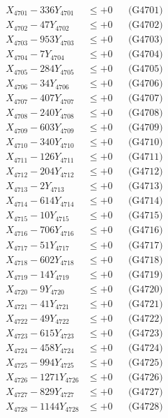 \documentclass[a4paper,10pt]{article}
\begin{document}
{\begin{align}
\allowbreak
X_{4701} - 336Y_{4701} &\leq +0 && \text{(G4701)} \\
X_{4702} - 47Y_{4702} &\leq +0 && \text{(G4702)} \\
X_{4703} - 953Y_{4703} &\leq +0 && \text{(G4703)} \\
X_{4704} - 7Y_{4704} &\leq +0 && \text{(G4704)} \\
X_{4705} - 284Y_{4705} &\leq +0 && \text{(G4705)} \\
X_{4706} - 34Y_{4706} &\leq +0 && \text{(G4706)} \\
X_{4707} - 407Y_{4707} &\leq +0 && \text{(G4707)} \\
X_{4708} - 240Y_{4708} &\leq +0 && \text{(G4708)} \\
X_{4709} - 603Y_{4709} &\leq +0 && \text{(G4709)} \\
X_{4710} - 340Y_{4710} &\leq +0 && \text{(G4710)} \\
\allowbreak
X_{4711} - 126Y_{4711} &\leq +0 && \text{(G4711)} \\
X_{4712} - 204Y_{4712} &\leq +0 && \text{(G4712)} \\
X_{4713} - 2Y_{4713} &\leq +0 && \text{(G4713)} \\
X_{4714} - 614Y_{4714} &\leq +0 && \text{(G4714)} \\
X_{4715} - 10Y_{4715} &\leq +0 && \text{(G4715)} \\
X_{4716} - 706Y_{4716} &\leq +0 && \text{(G4716)} \\
X_{4717} - 51Y_{4717} &\leq +0 && \text{(G4717)} \\
X_{4718} - 602Y_{4718} &\leq +0 && \text{(G4718)} \\
X_{4719} - 14Y_{4719} &\leq +0 && \text{(G4719)} \\
X_{4720} - 9Y_{4720} &\leq +0 && \text{(G4720)} \\
\allowbreak
X_{4721} - 41Y_{4721} &\leq +0 && \text{(G4721)} \\
X_{4722} - 49Y_{4722} &\leq +0 && \text{(G4722)} \\
X_{4723} - 615Y_{4723} &\leq +0 && \text{(G4723)} \\
X_{4724} - 458Y_{4724} &\leq +0 && \text{(G4724)} \\
X_{4725} - 994Y_{4725} &\leq +0 && \text{(G4725)} \\
X_{4726} - 1271Y_{4726} &\leq +0 && \text{(G4726)} \\
X_{4727} - 829Y_{4727} &\leq +0 && \text{(G4727)} \\
X_{4728} - 1144Y_{4728} &\leq +0 && \text{(G4728)} \\

\end{align}}
\end{document}
